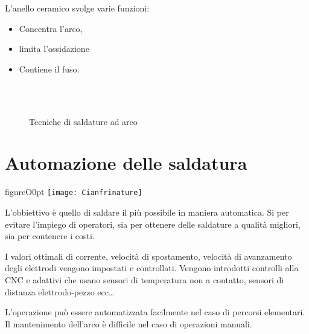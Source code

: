 L'anello ceramico svolge varie funzioni:
\begin{itemize}
\item Concentra l'arco,
\item limita l'ossidazione 
\item Contiene il fuso.
\end{itemize}

\begin{figure}
\centering
{}\:
\\
\:
\\
\:
\caption{Tecniche di saldature ad arco}
\label{fig:ArcWeld}
\end{figure}

\section{Automazione delle saldatura}

\begin{wrapfloat}{figure}{O}{0pt}
\texttt{[image: Cianfrinature]}
\caption{Esempi di preparazione dei metalli base da saldare tramite cianfrinature}
\label{fig:Cianfrinature}
\end{wrapfloat}

L'obbiettivo è quello di saldare il più possibile in maniera automatica.
Si per evitare l'impiego di operatori, sia per ottenere delle saldature a qualità migliori, sia per contenere i costi.

I valori ottimali di corrente, velocità di spostamento, velocità di avanzamento degli elettrodi vengono impostati e controllati.
Vengono introdotti controlli alla \ac{CNC} e adattivi che usano sensori di temperatura non a contatto, sensori di distanza elettrodo-pezzo ecc\dots

L'operazione può essere automatizzata facilmente nel caso di percorsi elementari.
Il mantenimento dell'arco è difficile nel caso di operazioni manuali.

